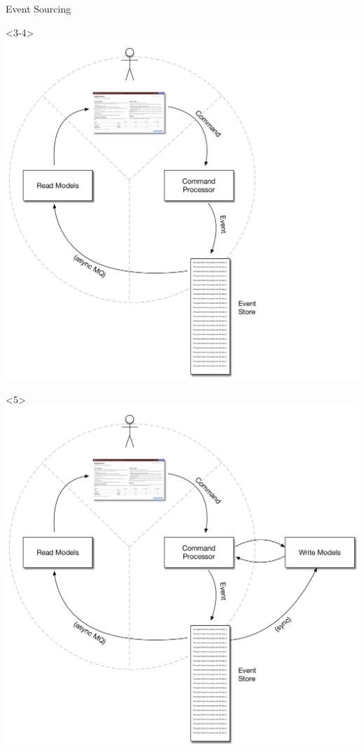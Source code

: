 \begin{frame}[fragile]{Event Sourcing}
\begin{minipage}{.7\textwidth}
\begin{onlyenv}
\end{onlyenv}
\begin{onlyenv}<3-4>
\includegraphics[width=\textwidth]{../EventSourcing3.pdf}
\end{onlyenv}
\begin{onlyenv}<5>
\includegraphics[width=\textwidth]{../EventSourcing4.pdf}

\end{onlyenv}
\end{minipage}
\end{frame}
